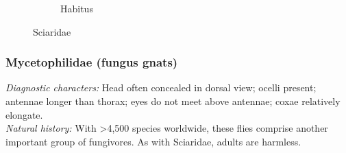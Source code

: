 \documentclass[letterpaper, 11pt]{article}
\begin{document}
\begin{figure}[ht!]
\begin{subfigure}[ht!]{0.25\textwidth}
        \caption{Habitus \citep[][Fig. 15.4]{mcalpine1981manual}}
        \label{fig:sciarid2}
    \end{subfigure}
    \caption{Sciaridae}\label{fig:sciarids}
\end{figure}

\subsubsection{Mycetophilidae (fungus gnats)}
\noindent{}\textit{Diagnostic characters:} Head often concealed in dorsal view; ocelli present; antennae longer than thorax; eyes do not meet above antennae; coxae relatively elongate.\\

\noindent{}\textit{Natural history:} With \textgreater4,500 species worldwide, these flies comprise another important group of fungivores. As with Sciaridae, adults are harmless.
\end{document}
